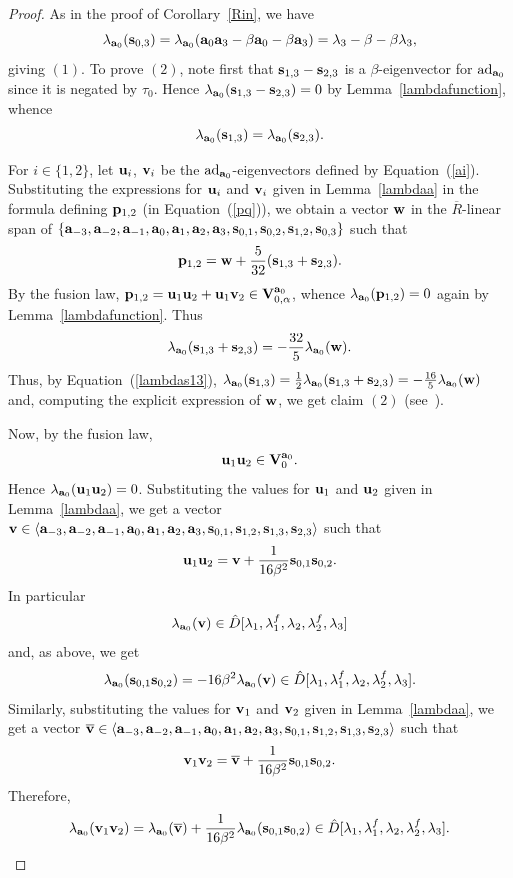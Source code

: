 \documentclass[a4paper]{amsart}
\newcommand{\Ro}{{\overline R}}
\newcommand{\Vo}{{\bf V}}
\newcommand{\ad}{{\rm ad}}
\newcommand{\lm}{\lambda}
\newcommand{\lmu}{\lambda_1}
\newcommand{\lmf}{\lambda_1^f}
\newcommand{\lmd}{\lambda_2}
\newcommand{\lmdf}{\lambda_2^f}
\newcommand{\al}{\alpha}
\newcommand{\bt}{\beta}
\newcommand{\bv}{{\bf v}}
\newcommand{\ba}{{\bf a}}
\newcommand{\bw}{{\bf w}}
\newcommand{\bu}{{\bf u}}
\newcommand{\bs}{{\bf s}}
\newcommand{\bp}{{\bf p}}
\begin{document}
\begin{proof}
As in the proof of Corollary~\ref{Rin}, we have
$$
\lambda_{\ba_0}(\bs_{0,3})=\lambda_{\ba_0}(\ba_0\ba_3-\bt \ba_0-\bt\ba_3)=\lm_3-\bt-\bt\lm_3,
$$
giving $(1)$.
To prove $(2)$, note first that $\bs_{1,3}-\bs_{2,3}$ is a $\bt$-eigenvector for $\ad_{\ba_0}$ since it is negated by $\tau_0$. Hence $\lambda_{\ba_0}(\bs_{1,3}-\bs_{2,3})=0$ by Lemma~\ref{lambdafunction}, whence  
\begin{equation}\label{lambdas13}
\lambda_{\ba_0}(\bs_{1,3})=\lambda_{\ba_0}(\bs_{2,3}).
\end{equation}

For $i\in \{1,2\}$, let $\bu_i$, $\bv_i$ be the $\ad_{\ba_0}$-eigenvectors defined by Equation~(\ref{ai}). Substituting the expressions for $\bu_i$ and $\bv_i$ given in Lemma~\ref{lambdaa} in the formula defining  $\bp_{1,2}$ (in Equation~(\ref{pq})), we obtain a vector $\bw$ in the $\Ro$-linear span of $\{\ba_{-3}, \ba_{-2}, \ba_{-1}, \ba_0, \ba_1, \ba_2, \ba_3, \bs_{0,1}, \bs_{0,2}, \bs_{1,2}, \bs_{0,3}\}$ such that
\begin{equation}\label{asin}
\bp_{1,2}=\bw+\frac{5}{32}(\bs_{1,3}+\bs_{2,3}).
\end{equation}
By the fusion law, $\bp_{1,2}=\bu_1\bu_2+\bu_1\bv_2\in \Vo_{0,\al}^{\ba_0}$, whence $\lambda_{\ba_0}(\bp_{1,2})=0$ again by Lemma~\ref{lambdafunction}. Thus
$$
\lambda_{\ba_0}(\bs_{1,3}+\bs_{2,3})=-\frac{32}{5}\lambda_{\ba_0}(\bw).
$$ 
Thus, by Equation~(\ref{lambdas13}), $\lambda_{\ba_0}(\bs_{1,3})=\frac{1}{2}\lambda_{\ba_0}(\bs_{1,3}+\bs_{2,3})=-\frac{16}{5}\lambda_{\ba_0}(\bw)$ and, computing the explicit expression of $\bw$, we get claim $(2)$ (see~\cite[genericsakuma-4bt.s]{code}).

Now, by the fusion law,
\begin{equation}\label{ulupo} 
\bu_1\bu_2\in \Vo_{0}^{\ba_0}.
\end{equation}
 Hence $\lambda_{\ba_0}( \bu_1\bu_2)=0$. Substituting  the values for $\bu_1$ and $\bu_2$ given in Lemma~\ref{lambdaa}, we get a vector $\bv\in \langle \ba_{-3}, \ba_{-2}, \ba_{-1}, \ba_0, \ba_1, \ba_2, \ba_3, \bs_{0,1}, \bs_{1,2}, \bs_{1,3}, \bs_{2,3} \rangle$ such that 
$$
\bu_1\bu_2=\bv+\frac{1}{16\bt^2}\bs_{0,1}\bs_{0,2}.
$$
 In particular 
\begin{equation}\label{lambdav}
\lambda_{\ba_0}(\bv)\in \hat D[\lmu, \lmf, \lmd, \lmdf, \lm_3]
\end{equation}
and, 
as above, we get
$$
\lambda_{\ba_0}(\bs_{0,1}\bs_{0,2})=-16\bt^2\lambda_{\ba_0}(\bv)\in \hat D[\lmu, \lmf, \lmd, \lmdf, \lm_3].
$$
Similarly, substituting  the values for $\bv_1$ and $\bv_2$ given in Lemma~\ref{lambdaa}, we get a vector 
$\overline{\bv}\in \langle \ba_{-3}, \ba_{-2}, \ba_{-1}, \ba_0, \ba_1, \ba_2, \ba_3, \bs_{0,1}, \bs_{1,2}, \bs_{1,3}, \bs_{2,3} \rangle$ such that
$$
\bv_1\bv_2=\overline{\bv}+\frac{1}{16\bt^2}\bs_{0,1}\bs_{0,2}.
$$
 Therefore, 
 $$\lambda_{\ba_0}(\bv_1\bv_2)=\lambda_{\ba_0}(\overline{\bv})+\frac{1}{16\bt^2}\lambda_{\ba_0}(\bs_{0,1}\bs_{0,2})\in \hat D[\lmu, \lmf, \lmd, \lmdf, \lm_3].
 $$


\end{proof}
\end{document}
